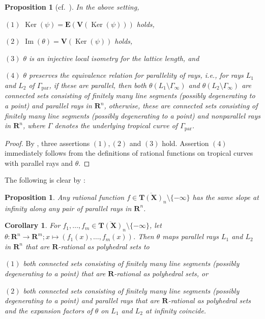 \documentclass[a4paper,12pt]{amsart}
\newtheorem{prop}[dfn]{Proposition}
\newtheorem{cor}[dfn]{Corollary}
\def\Gamma{\varGamma}
\begin{document}
\begin{prop}[cf.~{\cite[Proposition~3.11]{JuAe4}}]
    \label{prop4-1-2}
In the above setting,

$(1)$ $\operatorname{Ker}(\psi) = \boldsymbol{E}(\boldsymbol{V}(\operatorname{Ker}(\psi)))$ holds,

$(2)$ $\operatorname{Im}(\theta) = \boldsymbol{V}(\operatorname{Ker}(\psi))$ holds,

$(3)$ $\theta$ is an injective local isometry for the lattice length, and

$(4)$ $\theta$ preserves the equivalence relation for parallelity of rays, i.e., for rays $L_1$ and $L_2$ of $\Gamma_{\operatorname{par}}$, if these are parallel, then both $\theta(L_1 \setminus \Gamma_{\infty})$ and $\theta(L_2 \setminus \Gamma_{\infty})$ are connected sets consisting of finitely many line segments (possibly degenerating to a point) and parallel rays in $\boldsymbol{R}^n$, otherwise, these are connected sets consisting of finitely many line segments (possibly degenerating to a point) and nonparallel rays in $\boldsymbol{R}^n$, where $\Gamma$ denotes the underlying tropical curve of $\Gamma_{\operatorname{par}}$.
\end{prop}

\begin{proof}
By \cite[the proof of Proposition~3.11]{JuAe4}, three assertions $(1), (2)$ and $(3)$ hold.
Assertion $(4)$ immediately follows from the definitions of rational functions on tropical curves with parallel rays and $\theta$.
\end{proof}

The following is clear by \cite[the proof of Proposition~3.18]{JuAe5}:

\begin{prop}
    \label{prop4-1-3}
Any rational function $f \in \overline{\boldsymbol{T}(\boldsymbol{X})}_n \setminus \{ -\infty \}$ has the same slope at infinity along any pair of parallel rays in $\boldsymbol{R}^n$.
\end{prop}

\begin{cor}
    \label{cor4-1-1}
For $f_1, \ldots, f_m \in \overline{\boldsymbol{T}(\boldsymbol{X})}_n \setminus \{ -\infty \}$, let $\theta : \boldsymbol{R}^n \to \boldsymbol{R}^m; x \mapsto (f_1(x), \ldots, f_m(x))$.
Then $\theta$ maps parallel rays $L_1$ and $L_2$ in $\boldsymbol{R}^n$ that are $\boldsymbol{R}$-rational as polyhedral sets to

$(1)$ both connected sets consisting of finitely many line segments (possibly degenerating to a point) that are $\boldsymbol{R}$-rational as polyhedral sets, or

$(2)$ both connected sets consisting of finitely many line segments (possibly degenerating to a point) and parallel rays that are $\boldsymbol{R}$-rational as polyhedral sets and the expansion factors of $\theta$ on $L_1$ and $L_2$ at infinity coincide.
\end{cor}
\end{document}
